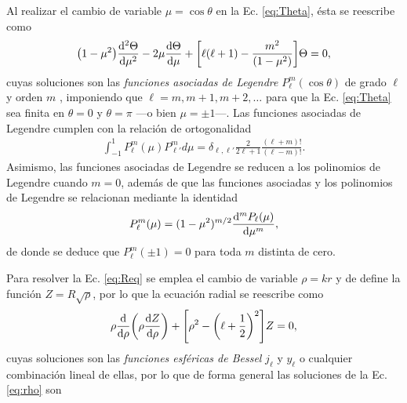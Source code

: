 Al realizar el cambio de variable $\mu = \cos\theta$ en la Ec. \eqref{eq:Theta}, ésta se reescribe como
	\begin{align*}
	\qty(1-\mu^2) \dv[2]{\Theta}{\mu} - 2 \mu \dv{\Theta}{\mu} + \qty[\ell(\ell+1)-\frac{m^2}{(1-\mu^2)}]\Theta= 0,
	\end{align*}
\hspace{-.5em}cuyas soluciones son	las \emph{funciones asociadas de Legendre} $P_\ell^m(\cos\theta)$ de grado $\ell$ y orden $m$  \cite{arfken2001methods}, imponiendo que $\ell = m, m+1,m+2,\ldots$ para  que la Ec. \eqref{eq:Theta} sea finita en $\theta = 0$ y $\theta = \pi$ ---o bien $\mu=\pm1$---. Las funciones asociadas de Legendre cumplen con la relación de ortogonalidad 
	\begin{align}
	\int_{-1}^1P_\ell^m(\mu) P_{\ell'}^md\mu = \delta_{\ell,\ell'}\frac{2}{2\ell+1}\frac{(\ell+m)!}{(\ell-m)!}.
	\label{eq:ortLegendre}
	\end{align}
\hspace{-.5em}Asimismo, las funciones asociadas de Legendre se reducen a los polinomios de Legendre cuando $m=0$, además de que las funciones asociadas y los polinomios de Legendre se relacionan mediante la identidad  \cite{arfken2001methods}
	\begin{align}
	P_\ell^m (\mu) = (1-\mu^2)^{m/2}\dv[m]{P_\ell(\mu)}{\mu},
	\label{eq:Legendre}
	\end{align}
de donde se deduce  que $P_\ell^m(\pm 1)=0$ para toda $m$ distinta de cero.

Para resolver la Ec. \eqref{eq:Req} se emplea el cambio de variable $\rho = k r$ y de define la función $Z =R\sqrt{\rho}$, por lo que la ecuación radial se reescribe como 
	\begin{align}
	\rho \dv{\rho}\qty(\rho\dv{Z}{\rho})+\qty[\rho^2-\qty(\ell+\frac12)^2] Z = 0,
	\label{eq:rho}
	\end{align}
cuyas soluciones son las \emph{funciones esféricas de Bessel} $j_\ell$ y $y_\ell$ o cualquier combinación lineal de ellas, por lo que de forma general las soluciones de la Ec. \eqref{eq:rho} son \cite{arfken2001methods} 

